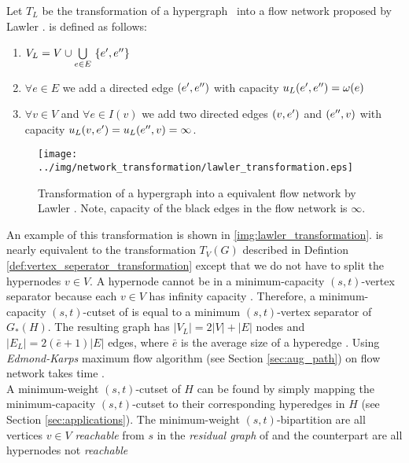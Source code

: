 \begin{definition}
Let $T_L$ be the transformation of a hypergraph \HypergraphDef~into 
a flow network  proposed by Lawler \cite{lawler1973}.  is defined as follows:
\begin{enumerate}
\item $V_L = V \cup \bigcup\limits_{e \in E}\ \{\incoming{e}, \outgoing{e}\}$
\item $\forall e \in E$ we add a directed edge $(e',e'')$ 
      with capacity $u_L(e',e'') = \omega(e)$
\item $\forall v \in V$ and $\forall e \in I(v)$ we add two directed edges $(v, e')$ and 
      $(e'', v)$ with capacity $u_L(v, e') = u_L(e'',v) = \infty$.
\end{enumerate} 
\end{definition}
\begin{figure}
\centering
\texttt{[image: ../img/network\_transformation/lawler\_transformation.eps]}
\caption{Transformation of a hypergraph into a equivalent flow network by Lawler \cite{lawler1973}. Note,
capacity of the black edges in the flow network is $\infty$.}
\label{img:lawler_transformation}
\end{figure}
An example of this transformation is shown in \autoref{img:lawler_transformation}.
 is nearly equivalent to the transformation $T_V(G)$ described in Defintion \autoref{def:vertex_seperator_transformation}
except that we do not have to split the hypernodes $v \in V$.
A hypernode cannot be in a minimum-capacity $(s,t)$-vertex separator because each $v \in V$ has
infinity capacity \cite{HuMoerder85}. Therefore, a minimum-capacity $(s,t)$-cutset 
of  is equal to a minimum $(s,t)$-vertex separator of $G_*(H)$.
The resulting graph  has $|V_L| = 2|V| + |E|$ nodes and $|E_L| = 2(\bar{e}+1)|E|$ edges, where
$\bar{e}$ is the average size of a hyperedge \cite{pistorius2003}. Using \emph{Edmond-Karps}
maximum flow algorithm (see Section \ref{sec:aug_path}) on flow network  
takes time  \cite{lawler1973}. \\
A minimum-weight $(s,t)$-cutset of $H$ can be found by simply mapping the minimum-capacity
$(s,t)$-cutset to their corresponding hyperedges in $H$ (see Section \ref{sec:applications}). 
The minimum-weight $(s,t)$-bipartition are all vertices $v \in V$ \emph{reachable} from $s$ in the 
\emph{residual graph} of  and the counterpart are all hypernodes not \emph{reachable}
